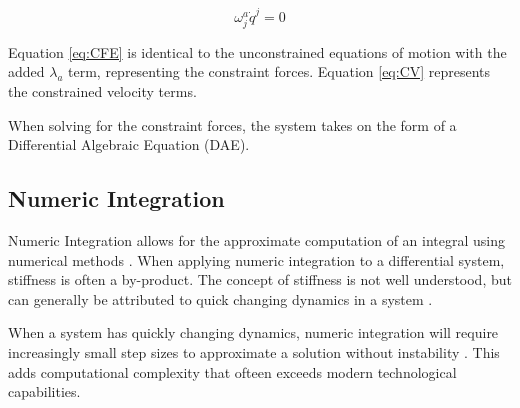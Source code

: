 \documentclass[12pt,letterpaper]{article}
\begin{document}
\begin{equation}
\label{eq:CV}
\omega_{j}^{a} \dot{q}^{j} = 0
\end{equation}

Equation \ref{eq:CFE} is identical to the unconstrained equations of motion with the added $\lambda_{a}$ term, representing the constraint forces.
Equation \ref{eq:CV} represents the constrained velocity terms. 
\par
When solving for the constraint forces, the system takes on the form of a Differential Algebraic Equation (DAE).

\subsection{Numeric Integration}
Numeric Integration allows for the approximate computation of an integral using numerical methods \cite{WolframNumeric}.
When applying numeric integration to a differential system, stiffness is often a by-product.
The concept of stiffness is not well understood, but can generally be attributed to quick changing dynamics in a system \cite{StiffSystem}.
\par
When a system has quickly changing dynamics, numeric integration will require increasingly small step sizes to approximate a solution without instability \cite{StiffSystem}. This adds computational complexity that ofteen exceeds modern technological capabilities.

\newpage
{}

\end{document}
